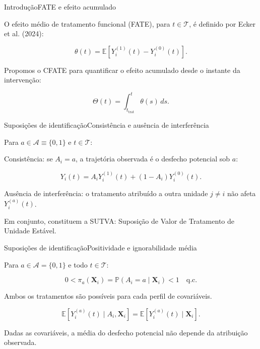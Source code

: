 \documentclass[aspectratio=169,t]{beamer}
\begin{document}
\begin{frame}{Introdução}{FATE e efeito acumulado}
\begin{topicos}
\item O efeito médio de tratamento funcional (FATE), para $t\in\mathcal T$, é definido por Ecker et al. (2024):
\end{topicos}
{\tamEquacao\[
\theta(t)=\mathbb E\!\left[Y_i^{(1)}(t)-Y_i^{(0)}(t)\right].
\]}
\begin{topicos}
\item Propomos o CFATE para quantificar o efeito acumulado desde o instante da intervenção:
\end{topicos}
{\tamEquacao\[
\Theta(t)=\int_{t_{\mathrm{trat}}}^{t}\theta(s)\,ds.
\]}
\end{frame}
\begin{frame}{Suposições de identificação}{Consistência e ausência de interferência}
{\tamCorpo Para $a\in\mathcal A\equiv\{0,1\}$ e $t\in\mathcal T$:\par}
\begin{topicos}
\item Consistência: se $A_i=a$, a trajetória observada é o desfecho potencial sob $a$:
\end{topicos}
{\tamEquacao\[
Y_i(t)=A_iY_i^{(1)}(t)+(1-A_i)Y_i^{(0)}(t).
\]}
\begin{topicos}
\item Ausência de interferência: o tratamento atribuído a outra unidade $j\ne i$ não afeta $Y_i^{(a)}(t)$.
\item Em conjunto, constituem a SUTVA: Suposição de Valor de Tratamento de Unidade Estável.
\end{topicos}
\end{frame}
\begin{frame}{Suposições de identificação}{Positividade e ignorabilidade média}
{\tamCorpo Para $a\in\mathcal A=\{0,1\}$ e todo $t\in\mathcal T$:\par}
\vspace{4bp}
{\tamEquacao\[
0<\pi_a(\mathbf X_i)=\mathbb P(A_i=a\mid\mathbf X_i)<1\quad\text{q.c.}
\]}
{\tamCorpo Ambos os tratamentos são possíveis para cada perfil de covariáveis.\par}
\vspace{12bp}
{\tamEquacao\[
\mathbb E\!\left[Y_i^{(a)}(t)\mid A_i,\mathbf X_i\right]
=\mathbb E\!\left[Y_i^{(a)}(t)\mid\mathbf X_i\right].
\]}
{\tamCorpo Dadas as covariáveis, a média do desfecho potencial não depende da atribuição observada.\par}
\end{frame}
\end{document}
